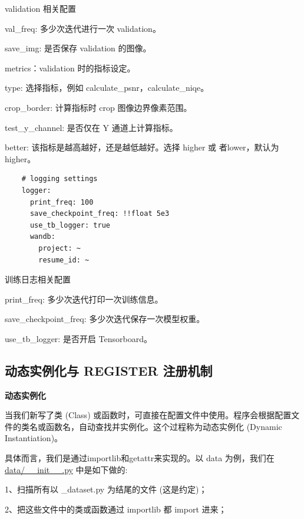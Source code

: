 \documentclass[../main.tex]{subfiles}
\begin{document}
	\begin{exampleBox}[righthand ratio=0.00, sidebyside, sidebyside align=center, lower separated=false]{validation 相关配置}
	
	val\_freq: 多少次迭代进行一次 validation。
	
    save\_img: 是否保存 validation 的图像。
    
    metrics：validation 时的指标设定。
    
    type: 选择指标，例如 calculate\_psnr，calculate\_niqe。
    
    crop\_border: 计算指标时 crop 图像边界像素范围。
    
    test\_y\_channel: 是否仅在 Y 通道上计算指标。
    
    better: 该指标是越高越好，还是越低越好。选择 higher 或 者lower，默认为 higher。
    \end{exampleBox}
    \begin{verbatim}
    # logging settings
    logger:
      print_freq: 100
      save_checkpoint_freq: !!float 5e3
      use_tb_logger: true
      wandb:
        project: ~
        resume_id: ~
	\end{verbatim}
	\begin{exampleBox}[righthand ratio=0.00, sidebyside, sidebyside align=center, lower separated=false]{训练日志相关配置}
	
	print\_freq: 多少次迭代打印一次训练信息。
    
    save\_checkpoint\_freq: 多少次迭代保存一次模型权重。
    
    use\_tb\_logger: 是否开启 Tensorboard。
    \end{exampleBox}
    
    \subsection{动态实例化与 REGISTER 注册机制}
	\textbf{动态实例化}
	
	当我们新写了类 (Class) 或函数时，可直接在配置文件中使用。程序会根据配置文件的类名或函数名，自动查找并实例化。这个过程称为动态实例化 (Dynamic Instantiation)。
	
	具体而言，我们是通过importlib和getattr来实现的。以 data 为例，我们在 \href{https://github.com/XPixelGroup/BasicSR/blob/master/basicsr/data/__init__.py}{data/\_\_init\_\_.py} 中是如下做的:

    1、扫描所有以 \_dataset.py 为结尾的文件 (这是约定)；
    
    2、把这些文件中的类或函数通过 importlib 都 import 进来；
    
\end{document}
